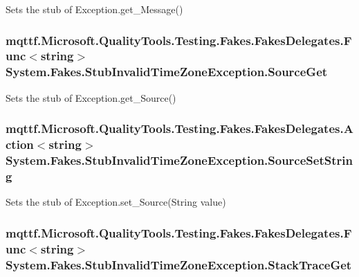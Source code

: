 Sets the stub of Exception.\-get\-\_\-\-Message()

\hypertarget{class_system_1_1_fakes_1_1_stub_invalid_time_zone_exception_ad6aab97512919d6b8545508a549ae337}{
\subsubsection[{Source\-Get}]{\setlength{\rightskip}{0pt plus 5cm}mqttf.\-Microsoft.\-Quality\-Tools.\-Testing.\-Fakes.\-Fakes\-Delegates.\-Func$<$string$>$ System.\-Fakes.\-Stub\-Invalid\-Time\-Zone\-Exception.\-Source\-Get}}\label{class_system_1_1_fakes_1_1_stub_invalid_time_zone_exception_ad6aab97512919d6b8545508a549ae337}


Sets the stub of Exception.\-get\-\_\-\-Source()

\hypertarget{class_system_1_1_fakes_1_1_stub_invalid_time_zone_exception_a77800feeb3e9c566e1e07989e6cac9ba}{
\subsubsection[{Source\-Set\-String}]{\setlength{\rightskip}{0pt plus 5cm}mqttf.\-Microsoft.\-Quality\-Tools.\-Testing.\-Fakes.\-Fakes\-Delegates.\-Action$<$string$>$ System.\-Fakes.\-Stub\-Invalid\-Time\-Zone\-Exception.\-Source\-Set\-String}}\label{class_system_1_1_fakes_1_1_stub_invalid_time_zone_exception_a77800feeb3e9c566e1e07989e6cac9ba}


Sets the stub of Exception.\-set\-\_\-\-Source(\-String value)

\hypertarget{class_system_1_1_fakes_1_1_stub_invalid_time_zone_exception_a16456b8d95405bf182ffce7de44843c2}{
\subsubsection[{Stack\-Trace\-Get}]{\setlength{\rightskip}{0pt plus 5cm}mqttf.\-Microsoft.\-Quality\-Tools.\-Testing.\-Fakes.\-Fakes\-Delegates.\-Func$<$string$>$ System.\-Fakes.\-Stub\-Invalid\-Time\-Zone\-Exception.\-Stack\-Trace\-Get}}\label{class_system_1_1_fakes_1_1_stub_invalid_time_zone_exception_a16456b8d95405bf182ffce7de44843c2}


